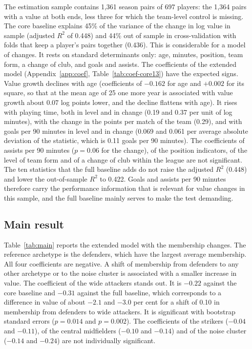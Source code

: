 The estimation sample contains 1,361 season pairs of 697 players: the 1,364 pairs with a value at both ends, less three for which the team-level control is missing. The core baseline explains 45\% of the variance of the change in log value in sample (adjusted $R^2$ of 0.448) and 44\% out of sample in cross-validation with folds that keep a player's pairs together (0.436). This is considerable for a model of changes. It rests on standard determinants only: age, minutes, position, team form, a change of club, and goals and assists. The coefficients of the extended model (Appendix~\ref{app:coef}, Table~\ref{tab:coef-core13}) have the expected signs. Value growth declines with age (coefficients of $-0.162$ for age and $+0.002$ for its square, so that at the mean age of 25 one more year is associated with value growth about 0.07 log points lower, and the decline flattens with age). It rises with playing time, both in level and in change (0.19 and 0.37 per unit of log minutes), with the change in the points per match of the team (0.29), and with goals per 90 minutes in level and in change (0.069 and 0.061 per average absolute deviation of the statistic, which is 0.11 goals per 90 minutes). The coefficients of assists per 90 minutes ($p=0.06$ for the change), of the position indicators, of the level of team form and of a change of club within the league are not significant. The ten statistics that the full baseline adds do not raise the adjusted $R^2$ (0.448) and lower the out-of-sample $R^2$ to 0.422. Goals and assists per 90 minutes therefore carry the performance information that is relevant for value changes in this sample, and the full baseline mainly serves to make the test demanding.

\subsection{Main result}

Table~\ref{tab:main} reports the extended model with the membership changes. The reference archetype is the defenders, which have the largest average membership. All four coefficients are negative. A shift of membership from defenders to any other archetype or to the noise cluster is associated with a smaller increase in value. The coefficient of the wide attackers stands out. It is $-0.22$ against the core baseline and $-0.31$ against the full baseline, which corresponds to a difference in value of about $-2.1$ and $-3.0$ per cent for a shift of 0.10 in membership from defenders to wide attackers. It is significant with bootstrap standard errors ($p=0.014$ and $p=0.002$). The coefficients of the strikers ($-0.04$ and $-0.11$), of the central midfielders ($-0.10$ and $-0.14$) and of the noise cluster ($-0.14$ and $-0.24$) are not individually significant.

